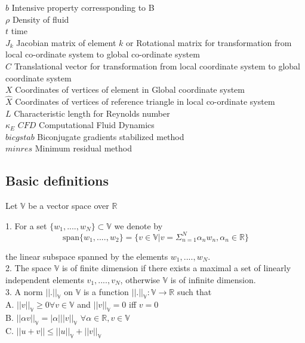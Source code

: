 \documentclass[a4paper,12pt]{book}
\begin{document}
$b$ Intensive property corressponding to B \\
$\rho$ Density of fluid \\
$t$ time\\
$J_k$ Jacobian matrix of element $k$ or Rotational matrix for transformation from local co-ordinate system to global co-ordinate system\\
$C$ Translational vector for transformation from local coordinate system to global coordinate system\\
$X$ Coordinates of vertices of element in Global coordinate system\\
$\hat{X}$ Coordinates of vertices of reference triangle in local co-ordinate system\\
$L$ Characteristic length for Reynolds number\\
$\kappa_E$
$CFD$ Computational Fluid Dynamics\\
$bicgstab$ Biconjugate gradients stabilized method\\
$minres$ Minimum residual method\\


\subsection{Basic definitions}\cite{crbm}

Let $\mathbb{V}$ be a vector space over $\mathbb{R}$

1. For a set $\lbrace w_1,....,w_N \rbrace \subset \mathbb{V}$ we denote by \\
\begin{equation} \label{vector space}
\mathrm{span} \lbrace w_1,....,w_2 \rbrace = \lbrace v \in \mathbb{V} | v = \Sigma_{n=1}^N \alpha_n w_n, \alpha_n \in \mathbb{R} \rbrace
\end{equation} 

the linear subspace spanned by the elements $w_1,....,w_N$.\\

2. The space $\mathbb{V}$ is of finite dimension if there exists a maximal a set of linearly independent elements $v_1,....,v_N$, otherwise $\mathbb{V}$ is of infinite dimension.\\

3. A norm $||.||_\mathbb{V}$ on $\mathbb{V}$ is a function $||.||_\mathbb{V} : \mathbb{V} \rightarrow \mathbb{R}$ such that\\ 
A. $||v||_\mathbb{V} \geq 0 \forall v \in \mathbb{V}$ and $||v||_\mathbb{V} = 0$ iff $v=0$\\
B. $||\alpha v||_\mathbb{V} = |\alpha| ||v||_\mathbb{V}$  $\forall \alpha \in \mathbb{R}, v \in \mathbb{V}$\\
C. $||u+v|| \leq ||u||_\mathbb{V} + ||v||_\mathbb{V}$\\
\end{document}
